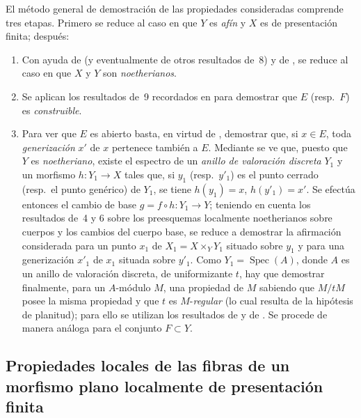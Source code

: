 \begin{env}[12.0.2]
\label{IV.12.0.2}
El método general de demostración de las propiedades consideradas comprende tres etapas.
Primero se reduce al caso en que $Y$ es \emph{afín} y $X$ es de presentación finita; después:

\medskip
\begin{enumerate}[label=\Alph*)]
  \item Con ayuda de  (y eventualmente de otros resultados de \textsection\,8) y de , se reduce al caso en que $X$ y $Y$ son \emph{noetherianos}.

  \item Se aplican los resultados de \textsection\,9 recordados en  para demostrar que $E$ (resp.\ $F$) es \emph{construible}.

  \item Para ver que $E$ es abierto basta, en virtud de , demostrar que, si $x\in E$, toda \emph{generización} $x'$ de $x$ pertenece también a $E$.
Mediante  se ve que, puesto que $Y$ es \emph{noetheriano}, existe el espectro de un \emph{anillo de valoración discreta} $Y_1$ y un morfismo $h:Y_1\to X$ tales que, si $y_1$ (resp.\ $y'_1$) es el punto cerrado (resp.\ el punto genérico) de $Y_1$, se tiene $h(y_1)=x$, $h(y'_1)=x'$.
Se efectúa entonces el cambio de base $g=f\circ h:Y_1\to Y$; teniendo en cuenta los resultados de \textsection\textsection\,4 y 6 sobre los preesquemas localmente noetherianos sobre cuerpos y los cambios del cuerpo base, se reduce a demostrar la afirmación considerada para un punto $x_1$ de $X_1=X\times_YY_1$ situado sobre $y_1$ y para una generización $x'_1$ de $x_1$ situada sobre $y'_1$.
Como $Y_1=\operatorname{Spec}(A)$, donde $A$ es un anillo de valoración discreta, de uniformizante $t$, hay que demostrar finalmente, para un $A$-módulo $M$, una propiedad de $M$ sabiendo que $M/tM$ posee la misma propiedad y que $t$ es $M$-\emph{regular} (lo cual resulta de la hipótesis de planitud); para ello se utilizan los resultados de  y de .
Se procede de manera análoga para el conjunto $F\subset Y$.
\end{enumerate}
\end{env}


\subsection{Propiedades locales de las fibras de un morfismo plano localmente de presentación finita}
\label{subsection:IV.12.1}

